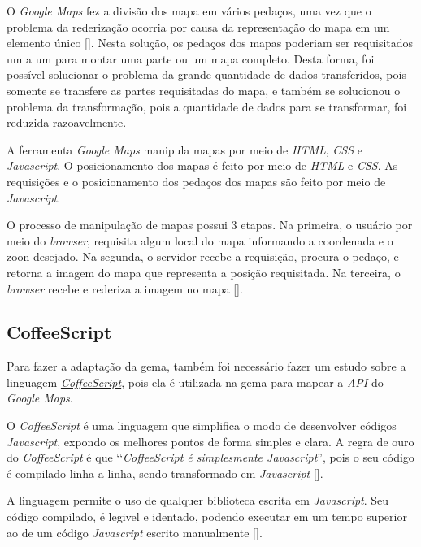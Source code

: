 O \emph{Google Maps} fez a divisão dos mapa em vários pedaços, uma vez que o problema da rederização
ocorria por causa da representação do mapa em um elemento único
[]. Nesta solução, os pedaços dos mapas
poderiam ser requisitados um a um para montar uma parte ou um mapa completo. Desta forma, foi possível
solucionar o problema da grande quantidade de dados transferidos, pois somente se transfere as partes
requisitadas do mapa, e também se solucionou o problema da transformação, pois a quantidade de dados
para se transformar, foi reduzida razoavelmente.

A ferramenta \emph{Google Maps} manipula mapas por meio de \emph{HTML}, \emph{CSS} e \emph{Javascript}.
O posicionamento dos mapas é feito por meio de \emph{HTML} e \emph{CSS}. As requisições e o posicionamento
dos pedaços dos mapas são feito por meio de \emph{Javascript}.

O processo de manipulação de mapas possui 3 etapas. Na primeira, o usuário por meio do \emph{browser},
requisita algum local do mapa informando a coordenada e o zoon desejado. Na segunda, o servidor recebe
a requisição, procura o pedaço, e retorna a imagem do mapa que representa a posição requisitada. Na
terceira, o \emph{browser} recebe e rederiza a imagem no mapa [].


\subsection{CoffeeScript}
\label{subsection:coffeescript}


Para fazer a adaptação da gema, também foi necessário fazer um estudo sobre a linguagem
\emph{\href{http://coffeescript.org/}{CoffeeScript}}, pois ela é utilizada na gema para
mapear a \emph{API} do \emph{Google Maps}.

O \emph{CoffeeScript} é uma linguagem que simplifica o modo de desenvolver códigos \emph{Javascript},
expondo os melhores pontos de forma simples e clara. A regra de ouro do \emph{CoffeeScript}
é que ‘‘\emph{CoffeeScript é simplesmente Javascript}'', pois o seu código é compilado linha a linha,
sendo transformado em \emph{Javascript} [].

A linguagem permite o uso de qualquer biblioteca escrita em \emph{Javascript}. Seu código compilado,
é legivel e identado, podendo executar em um tempo superior ao de um código \emph{Javascript} escrito
manualmente [].

